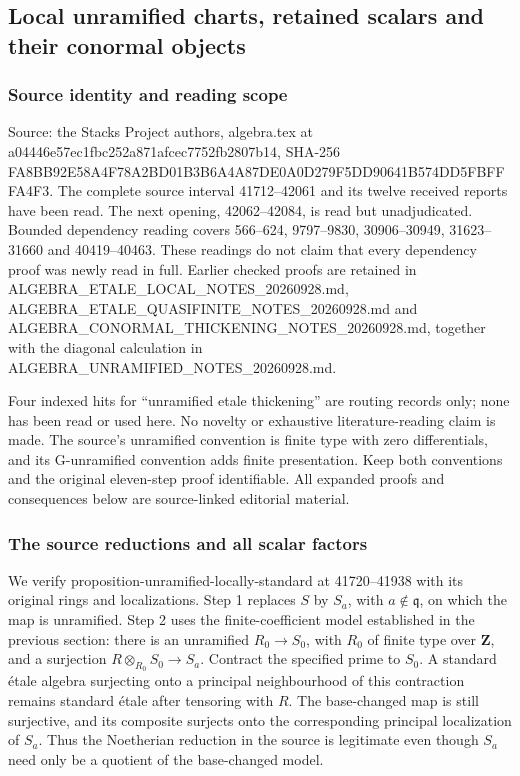 \subsection{Local unramified charts, retained scalars and their conormal objects}\label{algebra-proof-057-local-unramified-charts-retained-scalars-and-their-conormal-objects}

\subsubsection{Source identity and reading scope}\label{algebra-proof-057-source-identity-and-reading-scope}

Source: the Stacks Project authors, algebra.tex at a04446e57ec1fbc252a871afcec7752fb2807b14, SHA-256 FA8BB92E58A4F78A2BD01B3B6A4A87DE0A0D279F5DD90641B574DD5FBFFFA4F3. The complete source interval 41712--42061 and its twelve received reports have been read. The next opening, 42062--42084, is read but unadjudicated. Bounded dependency reading covers 566--624, 9797--9830, 30906--30949, 31623--31660 and 40419--40463. These readings do not claim that every dependency proof was newly read in full. Earlier checked proofs are retained in ALGEBRA\_ETALE\_LOCAL\_NOTES\_20260928.md, ALGEBRA\_ETALE\_QUASIFINITE\_NOTES\_20260928.md and ALGEBRA\_CONORMAL\_THICKENING\_NOTES\_20260928.md, together with the diagonal calculation in ALGEBRA\_UNRAMIFIED\_NOTES\_20260928.md.

Four indexed hits for ``unramified etale thickening'' are routing records only; none has been read or used here. No novelty or exhaustive literature-reading claim is made. The source's unramified convention is finite type with zero differentials, and its G-unramified convention adds finite presentation. Keep both conventions and the original eleven-step proof identifiable. All expanded proofs and consequences below are source-linked editorial material.

\subsubsection{The source reductions and all scalar factors}\label{algebra-proof-057-the-source-reductions-and-all-scalar-factors}

We verify proposition-unramified-locally-standard at 41720--41938 with its original rings and localizations. Step 1 replaces \(S\) by \(S_a\), with \(a\notin\mathfrak q\), on which the map is unramified. Step 2 uses the finite-coefficient model established in the previous section: there is an unramified \(R_0\to S_0\), with \(R_0\) of finite type over \(\mathbf Z\), and a surjection \(R\otimes_{R_0}S_0\to S_a\). Contract the specified prime to \(S_0\). A standard étale algebra surjecting onto a principal neighbourhood of this contraction remains standard étale after tensoring with \(R\). The base-changed map is still surjective, and its composite surjects onto the corresponding principal localization of \(S_a\). Thus the Noetherian reduction in the source is legitimate even though \(S_a\) need only be a quotient of the base-changed model.

